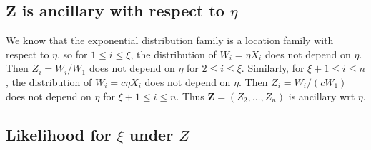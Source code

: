 \documentclass{article}
\begin{document}
\subsection{$\bm{Z}$ is ancillary with respect to $\eta$}
We know that the exponential distribution family
is a location family with respect to $\eta$,
so for $1 \leq i \leq \xi$,
the distribution of $W_i = \eta X_i$ does not depend on $\eta$.
Then $Z_i = W_i / W_1$ does not depend on $\eta$
for $2 \leq i \leq \xi$.
Similarly, for $\xi+1 \leq i \leq n$,
the distribution of $W_i = c \eta X_i$ does not depend on $\eta$.
Then $Z_i = W_i / (cW_1)$ does not depend on $\eta$
for $\xi+1 \leq i \leq n$.
Thus $\bm{Z} = (Z_2, \ldots, Z_n)$ is ancillary wrt $\eta$.

\subsection{Likelihood for $\xi$ under $Z$}
\end{document}
